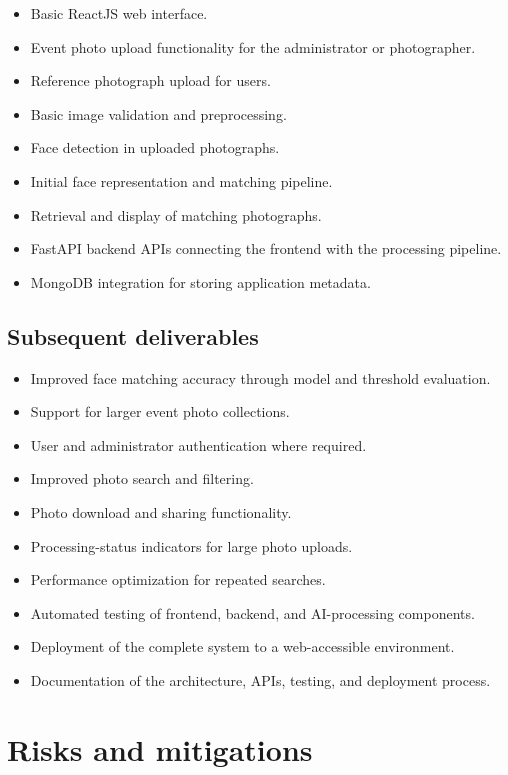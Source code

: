 \documentclass[11pt,a4paper]{article}
\begin{document}
\begin{itemize}[leftmargin=0.7cm]
    \item Basic ReactJS web interface.
    \item Event photo upload functionality for the administrator or
    photographer.
    \item Reference photograph upload for users.
    \item Basic image validation and preprocessing.
    \item Face detection in uploaded photographs.
    \item Initial face representation and matching pipeline.
    \item Retrieval and display of matching photographs.
    \item FastAPI backend APIs connecting the frontend with the
    processing pipeline.
    \item MongoDB integration for storing application metadata.
\end{itemize}

\subsection{Subsequent deliverables}

\begin{itemize}[leftmargin=0.7cm]
    \item Improved face matching accuracy through model and threshold
    evaluation.
    \item Support for larger event photo collections.
    \item User and administrator authentication where required.
    \item Improved photo search and filtering.
    \item Photo download and sharing functionality.
    \item Processing-status indicators for large photo uploads.
    \item Performance optimization for repeated searches.
    \item Automated testing of frontend, backend, and AI-processing
    components.
    \item Deployment of the complete system to a web-accessible
    environment.
    \item Documentation of the architecture, APIs, testing, and
    deployment process.
\end{itemize}

\section{Risks and mitigations}
\end{document}
